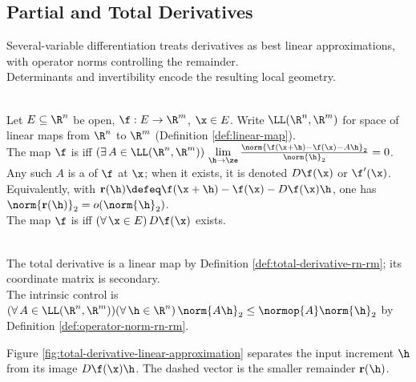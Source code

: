 \subsection{Partial and Total Derivatives}

%

Several-variable differentiation treats derivatives as best linear approximations, with operator norms controlling the remainder.\\
Determinants and invertibility encode the resulting local geometry.

\begin{definition} \label{def:total-derivative-rn-rm} \\
Let $E\subseteq\R^n$ be open, $\f:E\to\R^m$, $\x\in E$. Write $\LL(\R^n,\R^m)$ for space of linear maps from $\R^n$ to $\R^m$ (Definition \ref{def:linear-map}).\\
The map $\f$ is  iff $(\exists\,A\in\LL(\R^n,\R^m))\,\lim\limits_{\h\to\ze}\frac{\norm{\f(\x+\h)-\f(\x)-A\h}_2}{\norm{\h}_2}=0$.\\
Any such $A$ is a  of $\f$ at $\x$; when it exists, it is denoted $D\f(\x)$ or $\f'(\x)$.\\
Equivalently, with $\mathbf r(\h)\defeq\f(\x+\h)-\f(\x)-D\f(\x)\h$, one has $\norm{\mathbf r(\h)}_2=o(\norm{\h}_2)$.\\
The map $\f$ is  iff $(\forall\,\x\in E)\,D\f(\x)$ exists.
\end{definition}

\begin{perspective} \label{per:total-derivative-linear-map-first} \\
The total derivative is a linear map by Definition \ref{def:total-derivative-rn-rm}; its coordinate matrix is secondary.\\
The intrinsic control is $(\forall\,A\in\LL(\R^n,\R^m))(\forall\,\h\in\R^n)\,\norm{A\h}_2\leq\normop{A}\norm{\h}_2$ by Definition \ref{def:operator-norm-rn-rm}.
\end{perspective}

\noindent Figure \ref{fig:total-derivative-linear-approximation} separates the input increment $\h$ from its image $D\f(\x)\h$. The dashed vector is the smaller remainder $\mathbf r(\h)$.
\begin{illustrationfigure}[H]
  \centering
  
  \caption{The solid vector $D\f(\x)\h$ reaches the linear approximation; the dashed $\mathbf r(\h)=o(\norm{\h}_2)$ completes the actual increment.}
  \label{fig:total-derivative-linear-approximation}
\end{illustrationfigure}

